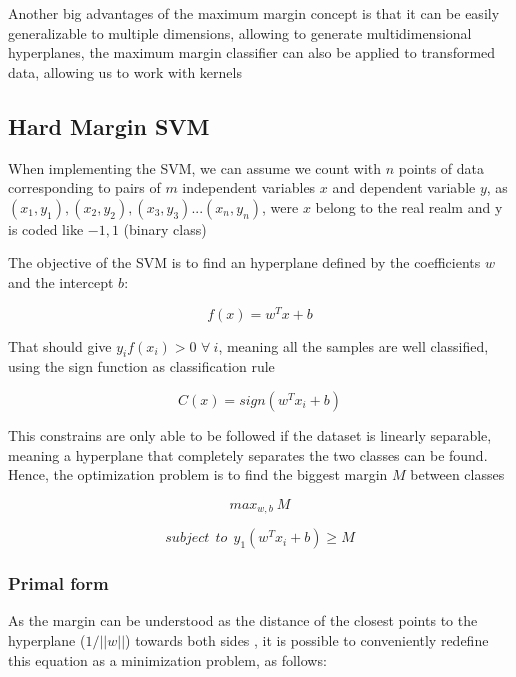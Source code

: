 \documentclass[11pt,twocolumn,letterpaper]{article}
\begin{document}
Another big advantages of the maximum margin concept is that it can be easily generalizable to multiple dimensions, allowing to generate multidimensional hyperplanes, the maximum margin classifier can also be applied to transformed data, allowing us to work with kernels \cite{Bishop2006}

\subsection{Hard Margin SVM}

When implementing the SVM, we can assume we count with $n$ points of data corresponding to pairs of $m$ independent variables $x$ and dependent variable $y$, as $(x_1,y_1), (x_2,y_2), (x_3,y_3) ... (x_n,y_n)$, were $x$ belong to the real realm and y is coded like ${-1,1}$ (binary class)

The objective of the SVM is to find an hyperplane defined by the coefficients $w$ and the intercept $b$:

\begin{equation}
	f(x) = w^T x + b
\end{equation}

That should give $y_i f(x_i) > 0$ $\forall \: i$, meaning all the samples are well classified, using the sign function as classification rule

\begin{equation}
	C(x) = sign(w^T x_i + b)
\end{equation}

This constrains are only able to be followed if the dataset is linearly separable, meaning a hyperplane that completely separates the two classes can be found. Hence, the optimization problem is to find the biggest margin $M$ between classes

\begin{equation}
	max_{w,b} \: M
\end{equation}

\begin{equation}
	subject \:\:to  \:\: y_1(w^T x_i + b) \geq M
\end{equation}

\subsubsection{Primal form}

As the margin can be understood as the distance of the closest points to the hyperplane ($1/||w||$) towards both sides \cite{Hastie2009}, it is possible to conveniently redefine this equation as a minimization problem, as follows:
\end{document}
